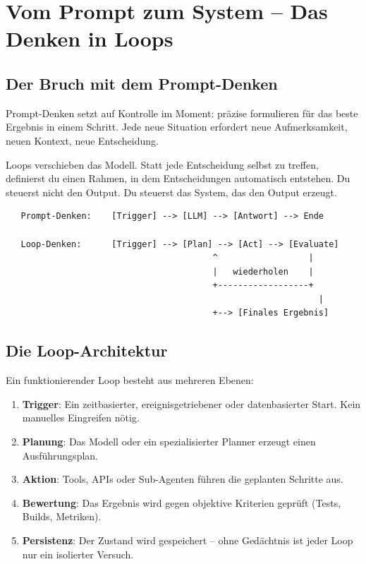 \section{Vom Prompt zum System -- Das Denken in Loops}

\subsection{Der Bruch mit dem Prompt-Denken}

Prompt-Denken setzt auf Kontrolle im Moment: präzise formulieren für das beste Ergebnis in einem Schritt. Jede neue Situation erfordert neue Aufmerksamkeit, neuen Kontext, neue Entscheidung.

Loops verschieben das Modell. Statt jede Entscheidung selbst zu treffen, definierst du einen Rahmen, in dem Entscheidungen automatisch entstehen. Du steuerst nicht den Output. Du steuerst das System, das den Output erzeugt.

\begin{verbatim}
   Prompt-Denken:    [Trigger] --> [LLM] --> [Antwort] --> Ende

   Loop-Denken:      [Trigger] --> [Plan] --> [Act] --> [Evaluate]
                                         ^                  |
                                         |   wiederholen    |
                                         +------------------+
                                                              |
                                         +--> [Finales Ergebnis]
\end{verbatim}

\subsection{Die Loop-Architektur}

Ein funktionierender Loop besteht aus mehreren Ebenen:

\begin{enumerate}[leftmargin=*]
    \item \textbf{Trigger}: Ein zeitbasierter, ereignisgetriebener oder datenbasierter Start. Kein manuelles Eingreifen nötig.
    \item \textbf{Planung}: Das Modell oder ein spezialisierter Planner erzeugt einen Ausführungsplan.
    \item \textbf{Aktion}: Tools, APIs oder Sub-Agenten führen die geplanten Schritte aus.
    \item \textbf{Bewertung}: Das Ergebnis wird gegen objektive Kriterien geprüft (Tests, Builds, Metriken).
    \item \textbf{Persistenz}: Der Zustand wird gespeichert -- ohne Gedächtnis ist jeder Loop nur ein isolierter Versuch.
\end{enumerate}

